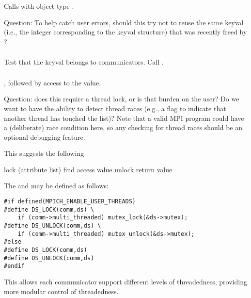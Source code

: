 \documentclass{article}
\begin{document}
\subsubsection{}
Calls  with object type
. 

Question: To help catch user errors, should this try not to reuse the
same keyval (i.e., the integer corresponding to the keyval structure)
that was recently freed by ?

\subsubsection{}
Test that the keyval belongs to communicators.  Call
. 



\subsubsection{}
\begin{adi3}
, followed by access to the value.

Question: does this require a thread lock, or is that burden on the user?  Do
we want to have the ability to detect thread races (e.g., a flag to indicate
that another thread has touched the list)?  Note that a valid MPI
program could have a (deliberate) race condition here, so any checking
for thread races should be an optional debugging feature.

This suggests the following
\begin{algorithm}
lock (attribute list)
find 
access value
unlock
return value
\end{algorithm}

The  and  may be defined as follows:
\begin{verbatim}
#if defined(MPICH_ENABLE_USER_THREADS}
#define DS_LOCK(comm,ds) \
    if (comm->multi_threaded) mutex_lock(&ds->mutex);
#define DS_UNLOCK(comm,ds) \
    if (comm->multi_threaded) mutex_unlock(&ds->mutex);
#else
#define DS_LOCK(comm,ds)
#define DS_UNLOCK(comm,ds)
#endif
\end{verbatim}
This allows each communicator support different levels of
threadedness, providing more modular control of threadedness.
\end{adi3}
\end{document}
